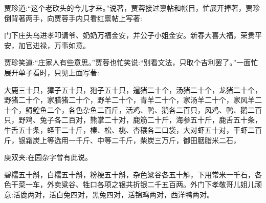 \begin{parag}
    贾珍道:“这个老砍头的今儿才来。”说著，贾蓉接过禀帖和帐目，忙展开捧著，贾珍倒背著两手，向贾蓉手内只看红禀帖上写著:
\end{parag}


\begin{qute2sp}
    门下庄头乌进孝叩请爷、奶奶万福金安，并公子小姐金安。新春大喜大福，荣贵平安，加官进禄，万事如意。
\end{qute2sp}


\begin{parag}
    贾珍笑道:“庄家人有些意思。”贾蓉也忙笑说:“别看文法，只取个吉利罢了。”一面忙展开单子看时，只见上面写著:
\end{parag}


\begin{qute2sp}
    大鹿三十只，獐子五十只，狍子五十只，暹猪二十个，汤猪二十个，龙猪二十个，野猪二十个，家腊猪二十个，野羊二十个，青羊二十个，家汤羊二十个，家风羊二十个，鲟鳇鱼二个，各色杂鱼二百斤，活鸡、鸭、鹅各二百只，风鸡、鸭、鹅二百只，野鸡、兔子各二百对，熊掌二十对，鹿筋二十斤，海参五十斤，鹿舌五十条，牛舌五十条，蛏干二十斤，榛、松、桃、杏穰各二口袋，大对虾五十对，干虾二百斤，银霜炭上等选用一千斤、中等二千斤，柴炭三万斤，御田胭脂米二石，\begin{note}庚双夹:在园杂字曾有此说。\end{note}碧糯五十斛，白糯五十斛，粉粳五十斛，杂色粱谷各五十斛，下用常米一千石，各色干菜一车，外卖粱谷、牲口各项之银共折银二千五百两。外门下孝敬哥儿姐儿顽意:活鹿两对，活白兔四对，黑兔四对，活锦鸡两对，西洋鸭两对。
\end{qute2sp}


